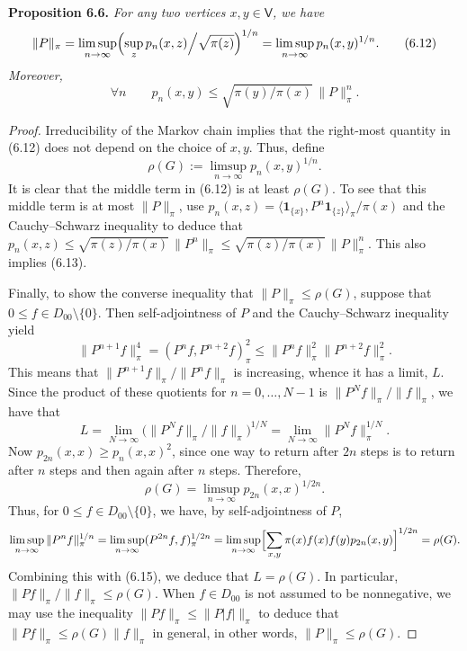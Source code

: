 \documentclass[11pt]{article}
\newcommand{\V}{\mathsf V}
\begin{document}
\medskip\noindent\textbf{Proposition 6.6.} \textit{For any two vertices $x,y\in\V$, we have}
\begin{equation}
\|P\|_\pi=\limsup_{n\to\infty}\Bigl(\sup_z p_n(x,z)\Big/\sqrt{\pi(z)}\Bigr)^{1/n}=\limsup_{n\to\infty}p_n(x,y)^{1/n}.\tag{6.12}
\end{equation}
\textit{Moreover,}
\begin{equation}
\forall n\qquad p_n(x,y)\le\sqrt{\pi(y)/\pi(x)}\,\|P\|_\pi^n.\tag{6.13}
\end{equation}
\begin{proof}
Irreducibility of the Markov chain implies that the right-most quantity in (6.12) does not depend on the choice of $x,y$. Thus, define
\begin{equation}
\rho(G):=\limsup_{n\to\infty}p_n(x,y)^{1/n}.\tag{6.14}
\end{equation}
It is clear that the middle term in (6.12) is at least $\rho(G)$. To see that this middle term is at most $\|P\|_\pi$, use $p_n(x,z)=\langle\mathbf 1_{\{x\}},P^n\mathbf 1_{\{z\}}\rangle_\pi\big/\pi(x)$ and the Cauchy--Schwarz inequality to deduce that $p_n(x,z)\le\sqrt{\pi(z)/\pi(x)}\,\|P^n\|_\pi\le\sqrt{\pi(z)/\pi(x)}\,\|P\|_\pi^n$. This also implies (6.13).

Finally, to show the converse inequality that $\|P\|_\pi\le\rho(G)$, suppose that $0\le f\in D_{00}\setminus\{0\}$. Then self-adjointness of $P$ and the Cauchy--Schwarz inequality yield
\[
\|P^{n+1}f\|_\pi^4=(P^nf,P^{n+2}f)_\pi^2\le\|P^nf\|_\pi^2\|P^{n+2}f\|_\pi^2.
\]
This means that $\|P^{n+1}f\|_\pi/\|P^nf\|_\pi$ is increasing, whence it has a limit, $L$. Since the product of these quotients for $n=0,\dots,N-1$ is $\|P^Nf\|_\pi/\|f\|_\pi$, we have that
\begin{equation}
L=\lim_{N\to\infty}\bigl(\|P^Nf\|_\pi/\|f\|_\pi\bigr)^{1/N}=\lim_{N\to\infty}\|P^Nf\|_\pi^{1/N}.\tag{6.15}
\end{equation}
Now $p_{2n}(x,x)\ge p_n(x,x)^2$, since one way to return after $2n$ steps is to return after $n$ steps and then again after $n$ steps. Therefore,
\[
\rho(G)=\limsup_{n\to\infty}p_{2n}(x,x)^{1/2n}.
\]
Thus, for $0\le f\in D_{00}\setminus\{0\}$, we have, by self-adjointness of $P$,
\[
\limsup_{n\to\infty}\|P^nf\|_\pi^{1/n}=\limsup_{n\to\infty}(P^{2n}f,f)_\pi^{1/2n}=\limsup_{n\to\infty}\Bigl[\sum_{x,y}\pi(x)f(x)f(y)p_{2n}(x,y)\Bigr]^{1/2n}=\rho(G).
\]
Combining this with (6.15), we deduce that $L=\rho(G)$. In particular, $\|Pf\|_\pi/\|f\|_\pi\le\rho(G)$. When $f\in D_{00}$ is not assumed to be nonnegative, we may use the inequality $\|Pf\|_\pi\le\|P|f|\|_\pi$ to deduce that $\|Pf\|_\pi\le\rho(G)\|f\|_\pi$ in general, in other words, $\|P\|_\pi\le\rho(G)$.
\end{proof}
\end{document}
